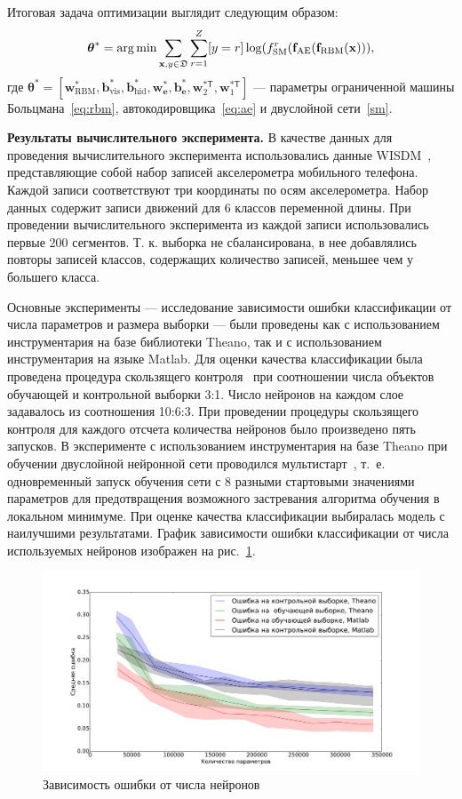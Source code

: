 Итоговая задача оптимизации выглядит следующим образом:
\[
 \boldsymbol{\theta}^{*} = \operatorname*{arg\,min}\sum_{\mathbf{x},y \in \mathfrak{D}}\sum_{r = 1}^Z[y = r]\log(f^r_\text{SM}(\mathbf{f}_\text{AE}(\mathbf{f}_\text{RBM}(\mathbf{x}))),
\]
где $\boldsymbol{\theta}^{*} = [{\mathbf{w}}^{*}_\text{RBM},{\mathbf{b}}^{*}_\text{vis},{\mathbf{b}^{*}_\text{hid}}, {\mathbf{w}}^{*}_\textbf{e}, {\mathbf{b}}^{*}_\textbf{e}, {\mathbf{w}^{*\mathsf{T}}_2}, \mathbf{w}^{*\mathsf{T}}_1]$ --- параметры ограниченной машины Больцмана~\eqref{eq:rbm}, автокодировщика~\eqref{eq:ae} и двуслойной сети~\eqref{sm}.


\textbf{Результаты вычислительного эксперимента. }
В качестве данных для проведения вычислительного эксперимента использовались данные WISDM~\cite{wisdm}, представляющие собой набор записей акселерометра мобильного телефона. Каждой записи соответствуют три координаты по осям акселерометра. Набор данных содержит записи движений для 6 классов переменной длины.
При проведении вычислительного эксперимента из каждой записи использовались первые 200 сегментов. Т. к. выборка не сбалансирована, в нее добавлялись повторы записей классов, содержащих количество записей, меньшее чем у большего класса.

Основные эксперименты --- исследование зависимости ошибки классификации от числа параметров и размера выборки --- были проведены как с использованием инструментария на базе библиотеки Theano, так и с использованием инструментария на языке Matlab.
Для оценки качества классификации была проведена процедура скользящего контроля~\cite{cv_ms} при соотношении числа объектов обучающей и контрольной выборки 3:1. Число нейронов на каждом слое задавалось из соотношения 10:6:3. При проведении процедуры скользящего контроля для каждого отсчета количества нейронов было произведено пять запусков. В эксперименте с использованием инструментария на базе Theano при обучении двуслойной нейронной сети проводился мультистарт~\cite{multi}, т.~е. одновременный запуск обучения сети с 8 разными стартовыми значениями параметров для предотвращения возможного застревания алгоритма обучения в локальном минимуме. При оценке качества классификации выбиралась модель с наилучшими результатами. График зависимости ошибки классификации от числа используемых нейронов изображен на рис.~\ref{fig:neurons}.


\begin{figure}[tb!]
 \centering
  \includegraphics[width=1.0\textwidth]{plots/popova/neurons.pdf}
 \caption{Зависимость ошибки от числа нейронов}
 \label{fig:neurons}
\end{figure}


